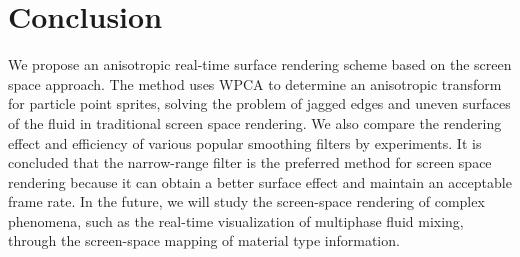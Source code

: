 \documentclass[times,twocolumn,final]{elsarticle}
\begin{document}
\section{Conclusion}
We propose an anisotropic real-time surface rendering scheme based on the screen space approach. The method uses WPCA to determine an anisotropic transform for particle point sprites, solving the problem of jagged edges and uneven surfaces of the fluid in traditional screen space rendering. We also compare the rendering effect and efficiency of various popular smoothing filters by experiments. It is concluded that the narrow-range filter is the preferred method for screen space rendering because it can obtain a better surface effect and maintain an acceptable frame rate. In the future, we will study the screen-space rendering of complex phenomena, such as the real-time visualization of multiphase fluid mixing, through the screen-space mapping of material type information.






\end{document}
